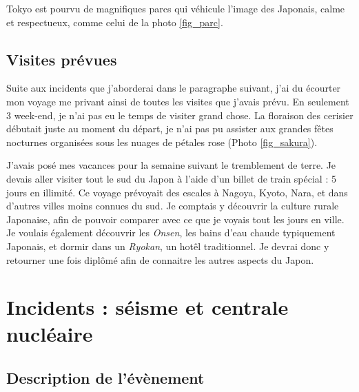 \documentclass[journal]{RapportFR}
\begin{document}
\begin{CJK*}{UTF8}{min}
Tokyo est pourvu de magnifiques parcs qui v\'ehicule l'image des Japonais, calme et respectueux, comme celui de la photo \ref{fig_parc}.


\subsection{Visites pr\'evues}


Suite aux incidents que j'aborderai dans le paragraphe suivant, j'ai du \'ecourter mon voyage me privant ainsi de toutes les visites que j'avais prévu.
En seulement 3 week-end, je n'ai pas eu le temps de visiter grand chose. 
La floraison des cerisier d\'ebutait juste au moment du d\'epart, je n'ai pas pu assister aux grandes f\^etes nocturnes organis\'ees sous les nuages de p\'etales rose (Photo \ref{fig_sakura}).  

J'avais pos\'e mes vacances pour la semaine suivant le tremblement de terre. Je devais aller visiter tout le sud du Japon \`a l'aide d'un billet de train sp\'ecial : 5 jours en illimit\'e.
Ce voyage pr\'evoyait des escales \`a Nagoya, Kyoto, Nara, et dans d'autres villes moins connues du sud. Je comptais y d\'ecouvrir la culture rurale Japonaise, afin de pouvoir comparer avec ce que je voyais tout les jours en ville. Je voulais \'egalement d\'ecouvrir les \textit{Onsen}, les bains d'eau chaude typiquement Japonais, et dormir dans un \textit{Ryokan}, un hot\^el traditionnel. Je devrai donc y retourner une fois dipl\^om\'e afin de connaitre les autres aspects du Japon.

\section{Incidents : s\'eisme et centrale nucl\'eaire}

\subsection{Description de l'\'ev\`enement}


\end{CJK*}
\end{document}
